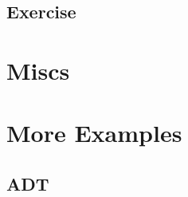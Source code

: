 \documentclass[oneside,11pt,dvipsnames]{book}
\begin{document}



\section{Exercise}




\appendix

\chapter{Miscs}





\chapter{More Examples}
\section{ADT}
\end{document}
